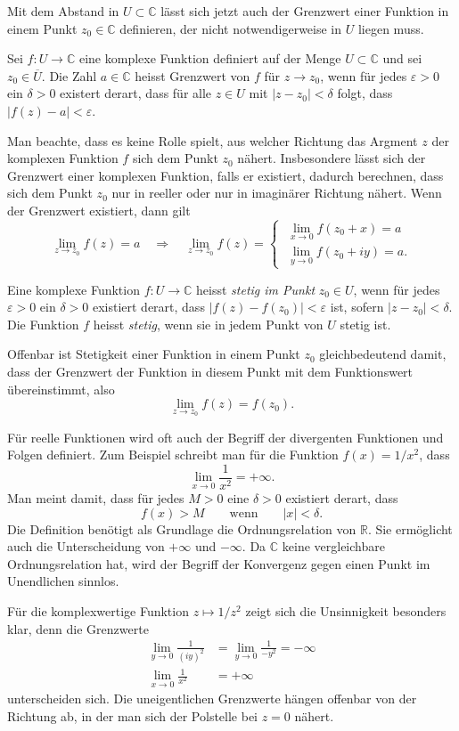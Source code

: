 Mit dem Abstand in $U\subset\mathbb{C}$  lässt sich jetzt auch der
Grenzwert einer Funktion in einem Punkt $z_0\in\mathbb{C}$ definieren,
der nicht notwendigerweise in $U$ liegen muss.

\begin{definition}
Sei $f\colon U\to\mathbb{C}$ eine komplexe Funktion definiert auf der
Menge $U\subset\mathbb{C}$ und sei $z_0\in \overline{U}$.
Die Zahl $a\in\mathbb{C}$ heisst Grenzwert von $f$ für $z\to z_0$,
wenn für jedes $\varepsilon>0$ ein $\delta>0$ existert derart,
dass für alle $z\in U$ mit $|z-z_0|<\delta$
folgt, dass $|f(z)-a|<\varepsilon$.
\end{definition}

Man beachte, dass es keine Rolle spielt, aus welcher Richtung das
Argment $z$ der komplexen Funktion $f$ sich dem Punkt $z_0$ nähert.
Insbesondere lässt sich der Grenzwert einer komplexen Funktion,
falls er existiert, dadurch berechnen, dass sich dem Punkt $z_0$
nur in reeller oder nur in imaginärer Richtung nähert.
Wenn der Grenzwert existiert, dann gilt
\[
\lim_{z\to z_0} f(z) = a
\quad\Rightarrow\quad
\lim_{z\to z_0} f(z)
=
\begin{cases}
\;\displaystyle
\lim_{x\to 0} f(z_0+x) = a \\
\;\displaystyle
\lim_{y\to 0} f(z_0+iy) = a.
\end{cases}
\]

\begin{definition}[Stetigkeit]
%
Eine komplexe Funktion $f\colon U\to\mathbb{C}$ heisst
\emph{stetig im Punkt} $z_0\in U$, wenn für jedes $\varepsilon >0$
ein $\delta>0$ existiert derart, dass $|f(z)-f(z_0)|<\varepsilon$
ist, sofern $|z-z_0|<\delta$.
Die Funktion $f$ heisst \emph{stetig}, wenn sie in jedem Punkt von $U$
stetig ist.
%
\end{definition}

Offenbar ist Stetigkeit einer Funktion in einem Punkt $z_0$ gleichbedeutend
damit, dass der Grenzwert der Funktion in diesem Punkt mit dem Funktionswert
übereinstimmt, also
\[
\lim_{z\to z_0} f(z) = f(z_0).
\]

Für reelle Funktionen wird oft auch der Begriff der divergenten Funktionen
und Folgen definiert.
%
Zum Beispiel schreibt man für die Funktion $f(x) = 1/x^2$, dass
\[
\lim_{x\to 0}
\frac{1}{x^2}
=
+\infty.
\]
Man meint damit, dass für jedes $M>0$ eine $\delta>0$ existiert derart,
dass
\[
f(x) > M
\qquad\text{wenn}\qquad
|x|<\delta.
\]
Die Definition benötigt als Grundlage die Ordnungsrelation von $\mathbb{R}$.
Sie ermöglicht auch die Unterscheidung von $+\infty$ und $-\infty$.
Da $\mathbb{C}$ keine vergleichbare Ordnungsrelation hat, wird der Begriff
der Konvergenz gegen einen Punkt im Unendlichen sinnlos.

Für die komplexwertige Funktion $z\mapsto 1/z^2$ zeigt sich die Unsinnigkeit
besonders klar, denn die Grenzwerte
\begin{align*}
\lim_{y\to 0} \frac{1}{(iy)^2}
&=
\lim_{y\to 0} \frac{1}{-y^2}
=
-\infty
\\
\lim_{x\to 0}\frac{1}{x^2}
&=
+\infty
\end{align*}
unterscheiden sich.
Die uneigentlichen Grenzwerte hängen offenbar von der Richtung ab,
in der man sich der Polstelle bei $z=0$ nähert.
